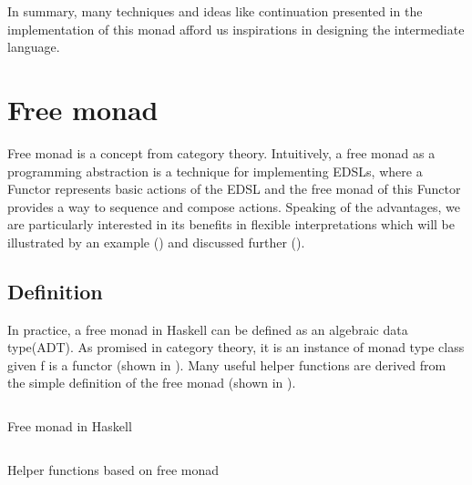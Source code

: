 In summary, many techniques and ideas like continuation presented in the implementation of this monad afford us inspirations in designing the intermediate language.
\section{Free monad} \label{b:fm}
Free monad\cite{contributorsCatsFreeMonads} is a concept from category theory. Intuitively, a free monad as a programming abstraction is a technique for implementing EDSLs, where a Functor represents basic actions of the EDSL and the free monad of this Functor provides a way to sequence and compose actions. Speaking of the advantages, we are particularly interested in its benefits in flexible interpretations which will be illustrated by an example () and discussed further ().
\subsection{Definition}
In practice, a free monad in Haskell can be defined as an algebraic data type(ADT). As promised in category theory, it is an instance of monad type class given f is a functor (shown in ). Many useful helper functions are derived from the simple definition of the free monad (shown in ).
\begin{code}
  \inputminted{haskell}{background/fm-construction.hs}
  \caption{Free monad in Haskell}
  \label{b:fm:c1}
\end{code}
\begin{code}
  \inputminted{haskell}{background/fm-helper.hs}
  \caption{Helper functions based on free monad}
  \label{b:fm:c2}
\end{code}
